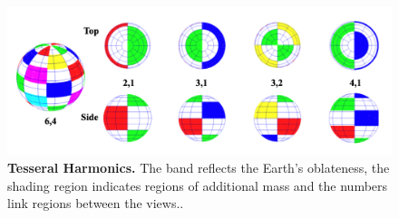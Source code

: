 \begin{figure}[hbt]
    \centering
    \includegraphics[width=.85\textwidth]{perturbation/tesseral}
    \caption{\textbf{Tesseral Harmonics.} The band reflects the Earth's oblateness, the shading region indicates regions of additional mass and the numbers link regions  between the views.\cite[]{}.}
    \label{fig:tesseral}
\end{figure}


